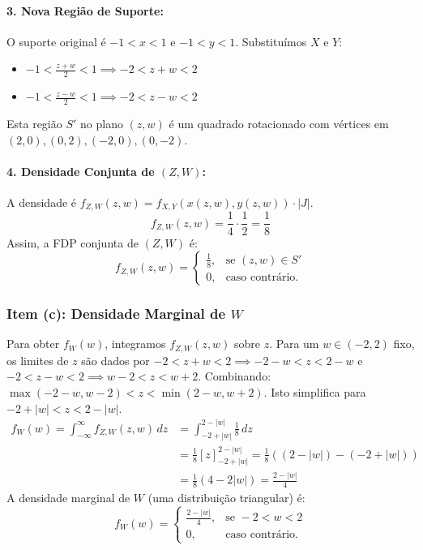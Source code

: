 \documentclass[
]{article}
\begin{document}
\paragraph{3. Nova Região de Suporte:}

O suporte original é \(-1<x<1\) e \(-1<y<1\). Substituímos \(X\) e
\(Y\):

\begin{itemize}
    \item $-1 < \frac{z+w}{2} < 1 \implies -2 < z+w < 2$
    \item $-1 < \frac{z-w}{2} < 1 \implies -2 < z-w < 2$
\end{itemize}

Esta região \(S'\) no plano \((z,w)\) é um quadrado rotacionado com
vértices em \((2,0), (0,2), (-2,0), (0,-2)\).

\paragraph{4. Densidade Conjunta de $(Z, W)$:}

A densidade é \(f_{Z,W}(z,w) = f_{X,Y}(x(z,w), y(z,w)) \cdot |J|\).
\[ f_{Z,W}(z,w) = \frac{1}{4} \cdot \frac{1}{2} = \frac{1}{8} \] Assim,
a FDP conjunta de \((Z,W)\) é: \[ f_{Z,W}(z,w) = 
\begin{cases}
    \frac{1}{8}, & \text{se } (z,w) \in S' \\
    0, &  \text{caso contrário.}
\end{cases}
\]

\subsubsection*{Item (c): Densidade Marginal de $W$}

Para obter \(f_W(w)\), integramos \(f_{Z,W}(z,w)\) sobre \(z\). Para um
\(w \in (-2,2)\) fixo, os limites de \(z\) são dados por
\(-2 < z+w < 2 \implies -2-w < z < 2-w\) e
\(-2 < z-w < 2 \implies w-2 < z < w+2\). Combinando:
\(\max(-2-w, w-2) < z < \min(2-w, w+2)\). Isto simplifica para
\(-2+|w| < z < 2-|w|\). \begin{align*}
    f_W(w) = \int_{-\infty}^{\infty} f_{Z,W}(z,w) \,dz &= \int_{-2+|w|}^{2-|w|} \frac{1}{8} \,dz \\
    &= \frac{1}{8} [z]_{-2+|w|}^{2-|w|} = \frac{1}{8} \left( (2-|w|) - (-2+|w|) \right) \\
    &= \frac{1}{8} (4 - 2|w|) = \frac{2-|w|}{4}
\end{align*} A densidade marginal de \(W\) (uma distribuição triangular)
é: \[ f_W(w) = 
\begin{cases}
    \frac{2-|w|}{4}, & \text{se } -2 < w < 2 \\
    0, &  \text{caso contrário.}
\end{cases}
\]
\end{document}

